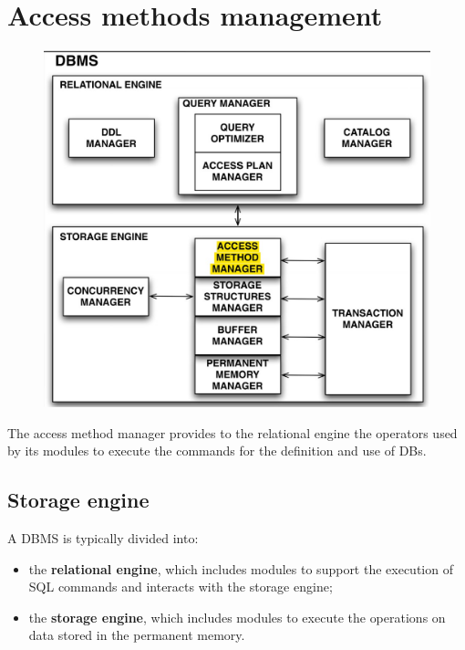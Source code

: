 \section{Access methods management}

\begin{figure}[h!]
		\centering
		\includegraphics[scale = 0.7]{img/access1.jpg}
		\label{part6}
\end{figure}

\begin{tcolorbox}
The access method manager provides to the relational engine the operators used by its modules to execute the commands for the definition and use of DBs.
\end{tcolorbox}

\subsection{Storage engine}
A DBMS is typically divided into:

\begin{itemize}
    \item the \textbf{relational engine}, which includes modules to support the execution of SQL commands and interacts with the storage engine;
    \item the \textbf{storage engine}, which includes modules to execute the operations on data stored in the permanent memory.
\end{itemize}

